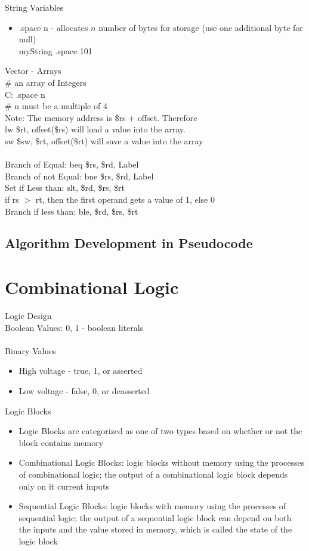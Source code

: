 \documentclass[12pt]{article}
\begin{document}
String Variables \begin{itemize} 
\item .space n - allocates $n$ number of bytes for storage (use one additional byte for null) \\ myString .space 101 
\end{itemize}  

\noindent Vector - Arrays \\ \# an array of Integers \\ C: .space n \\ 
\# n must be a multiple of 4 \\
Note: The memory address is \$rs + offset. Therefore \\
lw \$rt, offset(\$rs) will load a value into the array. \\
sw \$sw, \$rt, offset(\$rt) will save a value into the array \\~\\
Branch of Equal: beq \$rs, \$rd, Label \\ 
Branch of not Equal: bne \$rs, \$rd, Label \\ 
Set if Less than: slt, \$rd, \$rs, \$rt \\
if rs $>$ rt, then the first operand gets a value of 1, else 0 \\
Branch if less than: ble, \$rd, \$rs, \$rt  \\ 

\subsection{Algorithm Development in Pseudocode}

\section{Combinational Logic} 
Logic Design \\
Boolean Values: 0, 1 - boolean literals \\~\\

Binary Values \begin{itemize} 
\item High voltage - true, 1, or asserted 
\item Low voltage - false, 0, or deasserted \end{itemize} 

Logic Blocks \begin{itemize} 
\item Logic Blocks are categorized as one of two types based on whether or not the block contains memory 
\item Combinational Logic Blocks: logic blocks without memory using the processes of combinational logic; the output of a combinational logic block depends only on it current inputs 
\item Sequential Logic Blocks: logic blocks with memory using the processes of sequential logic; the output of a sequential logic block can depend on both the inputs and the value stored in memory, which is called the state of the logic block 
\end{itemize} 
\end{document}

